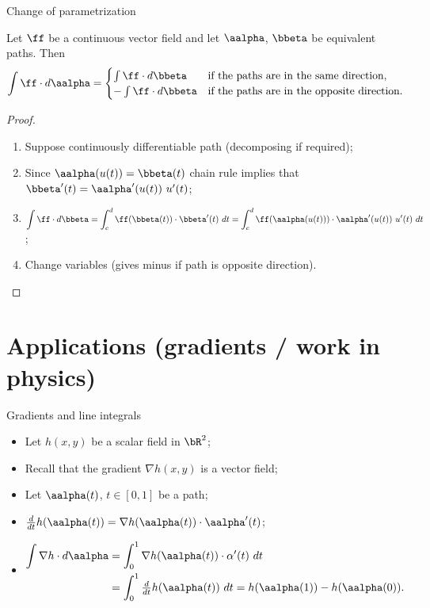     {Change of parametrization}

    \begin{theorem}
        Let \(\ff\) be a continuous vector field and let \(\aalpha\), \(\bbeta\) be equivalent paths.
        Then
        \[
            \int \ff \cdot d\aalpha =
            \begin{cases}
                \int \ff \cdot d\bbeta   & \text{if the paths are in the same direction},     \\
                - \int \ff \cdot d\bbeta & \text{if the paths are in the opposite direction}.
            \end{cases}
        \]
    \end{theorem}

    \begin{proof}
        \begin{enumerate}
            \item Suppose continuously differentiable path (decomposing if required);
            \item Since \(\aalpha(u(t)) = \bbeta(t)\) chain rule implies that
                  \( \bbeta'(t) = \aalpha'(u(t)) \ u'(t)\);
            \item
                  \(\displaystyle \int \ff \cdot  d\bbeta = \displaystyle \int_c^d \ff(\bbeta(t)) \cdot \bbeta'(t) \ dt =  \displaystyle \int_c^d \ff(\aalpha(u(t))) \cdot \aalpha'(u(t)) \ u'(t) \ dt \);
            \item Change variables (gives minus if path is opposite direction). \qedhere
        \end{enumerate}
    \end{proof}


\section{Applications (gradients / work in physics)}


    {Gradients and line integrals}

    \begin{itemize}
        \item Let \(h(x,y)\) be a scalar field in \(\bR^2\);
        \item Recall that the gradient \(\nabla h(x,y)\) is a vector field;
        \item Let \(\aalpha(t)\), \(t\in [0,1]\) be a path;
        \item \(\frac{d}{dt} h(\aalpha(t)) = \nabla h(\aalpha(t))\cdot \aalpha'(t)\);
        \item \[
                  \begin{aligned}
                      \int \nabla h \cdot d\aalpha
                       & = \int_0^1 \nabla h(\aalpha(t)) \cdot \alpha'(t)\ dt \\
                       & = \int_0^1 \tfrac{d}{dt} h(\aalpha(t)) \ dt
                      = h(\aalpha(1)) - h(\aalpha(0)).
                  \end{aligned}
              \]
    \end{itemize}





